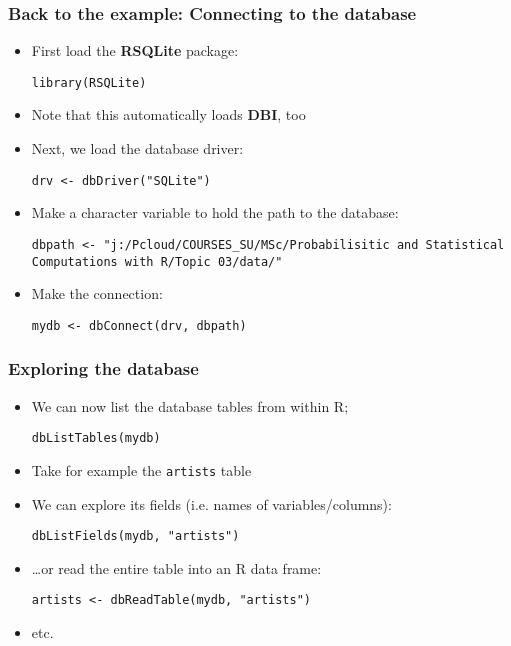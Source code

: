 \documentclass[10pt]{beamer}
\theoremstyle{definition}
\begin{document}
\begin{frame}[fragile]
\frametitle{Back to the example: Connecting to the database}
\begin{itemize}
	\item First load the \textbf{RSQLite} package:
	\begin{lstlisting}[style = rstyle, breaklines]
	library(RSQLite)
	\end{lstlisting}
	\item Note that this automatically loads \textbf{DBI}, too
	\item Next, we load the database driver:
	\begin{lstlisting}[style = rstyle, breaklines]
	drv <- dbDriver("SQLite")
	\end{lstlisting}
	\item Make a character variable to hold the path to the database:
	\begin{lstlisting}[style = rstyle, breaklines]
	dbpath <- "j:/Pcloud/COURSES_SU/MSc/Probabilisitic and Statistical Computations with R/Topic 03/data/"
	\end{lstlisting}
	\item Make the connection:
	\begin{lstlisting}[style = rstyle, breaklines]
	mydb <- dbConnect(drv, dbpath)
	\end{lstlisting}
\end{itemize}
\end{frame}

\begin{frame}[fragile]
\frametitle{Exploring the database}
\begin{itemize}
	\item We can now list the database tables from within R;
	\begin{lstlisting}[style = rstyle, breaklines]
	dbListTables(mydb)
	\end{lstlisting}
	\item Take for example the \texttt{artists} table
	\item We can explore its fields (i.e. names of variables/columns):
	\begin{lstlisting}[style = rstyle, breaklines]
	dbListFields(mydb, "artists")
	\end{lstlisting}
	\item \ldots or read the entire table into an R data frame:
	\begin{lstlisting}[style = rstyle, breaklines]
	artists <- dbReadTable(mydb, "artists")
	\end{lstlisting}
	\item etc.
\end{itemize}
\end{frame}
\end{document}
